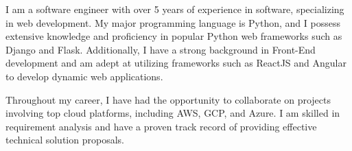 

\begin{cvparagraph}

I am a software engineer with over 5 years of experience in software, specializing in web development.
My major programming language is Python, and I possess extensive knowledge and proficiency in popular Python web frameworks such as Django and Flask.
Additionally, I have a strong background in Front-End development and am adept at utilizing frameworks such as ReactJS and Angular to develop dynamic web applications.

Throughout my career, I have had the opportunity to collaborate on projects involving top cloud platforms, including AWS, GCP, and Azure.
I am skilled in requirement analysis and have a proven track record of providing effective technical solution proposals.

\end{cvparagraph}
